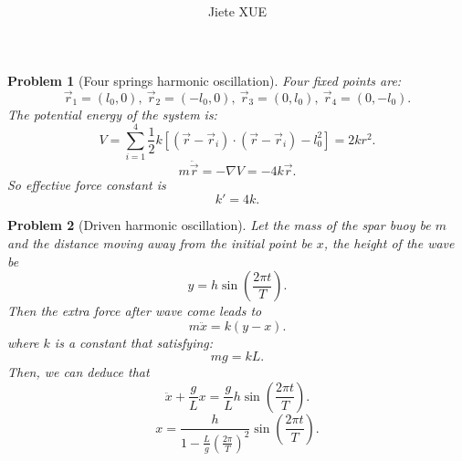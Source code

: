 \documentclass{article}
\title{\textbf{\mytitle}}
\author{Jiete XUE}
\date{\mydate}
\theoremstyle{1}
\newtheorem{problem}{Problem}
\begin{document}
\maketitle
\begin{problem}[Four springs harmonic oscillation]
    Four fixed points are:
    $$\vec{r}_1=\left(l_0,0\right),\ \vec{r}_2=\left(-l_0,0\right),\ \vec{r}_3=\left(0,l_0\right),\ \vec{r}_4=\left(0,-l_0\right).$$
    The potential energy of the system is:
    \begin{equation}
        V=\sum_{i=1}^{4}\frac{1}{2}k\left[\left(\vec{r}-\vec{r}_i\right)\cdot\left(\vec{r}-\vec{r}_i\right)-l_0^2\right]=2kr^2.
    \end{equation}
    \begin{equation}
        m\ddot{\vec{r}}=-\nabla V=-4k\vec{r}.
    \end{equation}
    So effective force constant is 
    \begin{equation}
        \boxed{k'=4k.}
    \end{equation}
\end{problem}
\begin{problem}[Driven harmonic oscillation]
    Let the mass of the spar buoy be $m$ and the distance moving away from the initial point be $x$, the height of the wave be
    \begin{equation}
        y=h\sin\left(\frac{2\pi t}{T} \right).
    \end{equation}
    Then the extra force after wave come leads to 
    \begin{equation}
        m\ddot{x}=k\left(y-x\right).
    \end{equation}
    where $k$ is a constant that satisfying:
    \begin{equation}
        mg=kL.
    \end{equation}
    Then, we can deduce that 
    \begin{equation}
        \ddot{x}+\frac{g}{L}x=\frac{g}{L}h\sin\left(\frac{2\pi t}{T}\right).
    \end{equation}
    \begin{equation}
        x=\frac{h}{1-\frac{L}{g}\left(\frac{2\pi}{T}\right)^2}\sin\left(\frac{2\pi t}{T}\right).
    \end{equation}
\end{problem}
\end{document}

